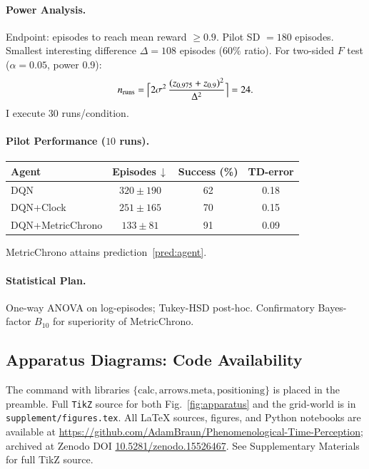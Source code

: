 \documentclass[preprint,11pt]{elsarticle}
\begin{document}
\paragraph{Power Analysis.}
Endpoint: episodes to reach mean reward $\ge 0.9$.
Pilot SD $=180$ episodes.  Smallest interesting difference
$\Delta=108$ episodes ($60\%$ ratio).  For two-sided
$F$ test ($\alpha=0.05$, power 0.9):
\[
n_{\mathrm{runs}}=\Bigl\lceil
    2\sigma^2 \,
    \frac{(z_{0.975}+z_{0.9})^2}{\Delta^2}
\Bigr\rceil = 24.
\]
I execute 30 runs/condition.

\paragraph{Pilot Performance ($10$ runs).}
\begin{center}
\begin{tabular}{lccc}
\toprule
Agent & Episodes\,$\downarrow$ & Success (\%) & TD-error \\
\midrule
DQN & $320\pm190$ & 62 & 0.18 \\
DQN+Clock & $251\pm165$ & 70 & 0.15 \\
DQN+MetricChrono & $133\pm81$ & 91 & 0.09 \\
\bottomrule
\end{tabular}
\end{center}
MetricChrono attains prediction~\ref{pred:agent}.

\paragraph{Statistical Plan.}
One-way ANOVA on log-episodes; Tukey-HSD post-hoc.  Confirmatory
Bayes-factor $B_{10}$ for superiority of MetricChrono.

\subsection{Apparatus Diagrams: Code Availability}
The command \texttt{\string\usetikzlibrary} with libraries \( \{\text{calc}, \text{arrows.meta}, \text{positioning}\} \) is placed in the preamble.  Full \texttt{TikZ} source for both
Fig.~\ref{fig:apparatus} and the grid-world is in
\texttt{supplement/figures.tex}. All \LaTeX{} sources, figures, and Python notebooks are available at \url{https://github.com/AdamBraun/Phenomenological-Time-Perception}; archived at Zenodo DOI \href{https://doi.org/10.5281/zenodo.15526467}{10.5281/zenodo.15526467}. See Supplementary Materials for full TikZ source.
\end{document}
